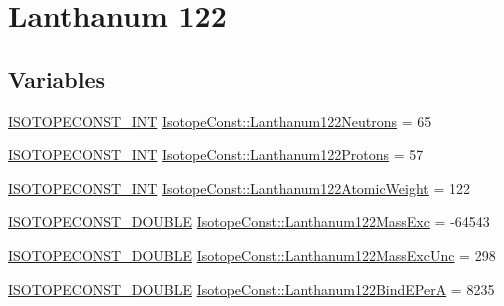 \hypertarget{group___isotope_const-_lanthanum-_la122}{}\section{Lanthanum 122}
\label{group___isotope_const-_lanthanum-_la122}
\subsection*{Variables}
\begin{DoxyCompactItemize}
\item 
\mbox{\hyperlink{group___isotope_const-_macros_ga5f18360b3e99483a35c32d789e62621c}{I\+S\+O\+T\+O\+P\+E\+C\+O\+N\+S\+T\+\_\+\+I\+NT}} \mbox{\hyperlink{group___isotope_const-_lanthanum-_la122_ga8b4a5f72b74ed6df84b6f5067ae371cb}{Isotope\+Const\+::\+Lanthanum122\+Neutrons}} = 65
\item 
\mbox{\hyperlink{group___isotope_const-_macros_ga5f18360b3e99483a35c32d789e62621c}{I\+S\+O\+T\+O\+P\+E\+C\+O\+N\+S\+T\+\_\+\+I\+NT}} \mbox{\hyperlink{group___isotope_const-_lanthanum-_la122_gaa32d62e9ffd255150c2688f986f4f802}{Isotope\+Const\+::\+Lanthanum122\+Protons}} = 57
\item 
\mbox{\hyperlink{group___isotope_const-_macros_ga5f18360b3e99483a35c32d789e62621c}{I\+S\+O\+T\+O\+P\+E\+C\+O\+N\+S\+T\+\_\+\+I\+NT}} \mbox{\hyperlink{group___isotope_const-_lanthanum-_la122_gacb9bd9ce23f3a381da254f88677acc59}{Isotope\+Const\+::\+Lanthanum122\+Atomic\+Weight}} = 122
\item 
\mbox{\hyperlink{group___isotope_const-_macros_ga8f45a7272ce02c0b4c65c44636ed719a}{I\+S\+O\+T\+O\+P\+E\+C\+O\+N\+S\+T\+\_\+\+D\+O\+U\+B\+LE}} \mbox{\hyperlink{group___isotope_const-_lanthanum-_la122_ga5bfc5b3f550d2d728813d950029665a5}{Isotope\+Const\+::\+Lanthanum122\+Mass\+Exc}} = -\/64543
\item 
\mbox{\hyperlink{group___isotope_const-_macros_ga8f45a7272ce02c0b4c65c44636ed719a}{I\+S\+O\+T\+O\+P\+E\+C\+O\+N\+S\+T\+\_\+\+D\+O\+U\+B\+LE}} \mbox{\hyperlink{group___isotope_const-_lanthanum-_la122_ga3dc7701e77df412bd67abcb7401f35f9}{Isotope\+Const\+::\+Lanthanum122\+Mass\+Exc\+Unc}} = 298
\item 
\mbox{\hyperlink{group___isotope_const-_macros_ga8f45a7272ce02c0b4c65c44636ed719a}{I\+S\+O\+T\+O\+P\+E\+C\+O\+N\+S\+T\+\_\+\+D\+O\+U\+B\+LE}} \mbox{\hyperlink{group___isotope_const-_lanthanum-_la122_ga62336cd9c27852e9594bef63a1d60e3b}{Isotope\+Const\+::\+Lanthanum122\+Bind\+E\+PerA}} = 8235
\item 

\end{DoxyCompactItemize}
